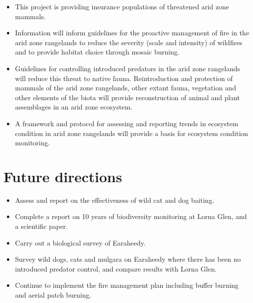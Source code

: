 \documentclass[version=last,
    paper=a4, %
    10pt, %
    usenames,
    dvipsnames,
    oneside, %
    headings=openany, %
    DIV=15 %
]{scrbook}
\begin{document}
\begin{itemize}
\itemsep1pt\parskip0pt
\item
  This project is providing insurance populations of threatened arid
  zone mammals.
\item
  Information will inform guidelines for the proactive management of
  fire in the arid zone rangelands to reduce the severity (scale and
  intensity) of wildfires and to provide habitat choice through mosaic
  burning.
\item
  Guidelines for controlling introduced predators in the arid zone
  rangelands will reduce this threat to native fauna. Reintroduction and
  protection of mammals of the arid zone rangelands, other extant fauna,
  vegetation and other elements of the biota will provide reconstruction
  of animal and plant assemblages in an arid zone ecosystem.
\item
  A framework and protocol for assessing and reporting trends in
  ecosystem condition in arid zone rangelands will provide a basis for
  ecosystem condition monitoring.
\end{itemize}




\section*{Future directions}

\begin{itemize}
\itemsep1pt\parskip0pt
\item
  Assess and report on the effectiveness of wild cat and dog baiting.
\item
  Complete a report on 10 years of biodiversity monitoring at Lorna
  Glen, and a scientific paper.
\item
  Carry out a biological survey of Earaheedy.
\item
  Survey wild dogs, cats and mulgara on Earaheedy where there has been
  no introduced predator control, and compare results with Lorna Glen.
\item
  Continue to implement the fire management plan including buffer
  burning and aerial patch burning.
\end{itemize}



\end{document}
